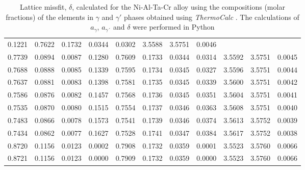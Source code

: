 \begin{table}[H]
\begin{tabular}{rrrrrrrrrrr}
0.1221 & 0.7622 & 0.1732 & 0.0344 & 0.0302 & 3.5588 & 3.5751 & 0.0046 \\0.7739 & 0.0894 & 0.0087 & 0.1280 & 0.7609 & 0.1733 & 0.0344 & 0.0314 & 3.5592 & 3.5751 & 0.0045 \\0.7688 & 0.0888 & 0.0085 & 0.1339 & 0.7595 & 0.1734 & 0.0345 & 0.0327 & 3.5596 & 3.5751 & 0.0044 \\0.7637 & 0.0881 & 0.0083 & 0.1398 & 0.7581 & 0.1735 & 0.0345 & 0.0339 & 3.5600 & 3.5751 & 0.0042 \\0.7586 & 0.0876 & 0.0082 & 0.1457 & 0.7568 & 0.1736 & 0.0345 & 0.0351 & 3.5604 & 3.5751 & 0.0041 \\0.7535 & 0.0870 & 0.0080 & 0.1515 & 0.7554 & 0.1737 & 0.0346 & 0.0363 & 3.5608 & 3.5751 & 0.0040 \\0.7483 & 0.0866 & 0.0078 & 0.1573 & 0.7541 & 0.1739 & 0.0346 & 0.0374 & 3.5613 & 3.5752 & 0.0039 \\0.7434 & 0.0862 & 0.0077 & 0.1627 & 0.7528 & 0.1741 & 0.0347 & 0.0384 & 3.5617 & 3.5752 & 0.0038 \\0.8720 & 0.1156 & 0.0123 & 0.0002 & 0.7908 & 0.1732 & 0.0359 & 0.0001 & 3.5523 & 3.5760 & 0.0066 \\0.8721 & 0.1156 & 0.0123 & 0.0000 & 0.7909 & 0.1732 & 0.0359 & 0.0000 & 3.5523 & 3.5760 & 0.0066
    \end{tabular}
    \caption{Lattice missfit, $\delta$, calculated for the Ni-Al-Ta-Cr alloy using the compositions (molar fractions) of the elements in $\gamma$ and $\gamma'$ phases obtained using \textit{ThermoCalc} \citep{thermocalc}. The calculations of $a_\gamma$, $a_{\gamma´}$ and $\delta$ were performed in Python \citep{mygit}}
    \label{tab:tab04}
\end{table}


